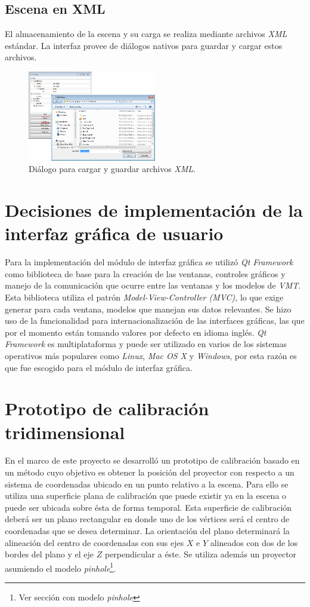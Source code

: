 \subsection{Escena en XML}
El almacenamiento de la escena y su carga se realiza mediante archivos \emph{XML} estándar. La interfaz provee de diálogos nativos para guardar y cargar estos archivos.

\begin{figure}[H]
  \centering
    \includegraphics[width=0.5\textwidth]{./Cap5_vmt/vmt_loadShow.png}
  \caption{Diálogo para cargar y guardar archivos \emph{XML}.}
  \label{fig:VMT-XML}
\end{figure}

\section{Decisiones de implementación de la interfaz gráfica de usuario}
Para la implementación del módulo de interfaz gráfica se utilizó \emph{Qt Framework} \cite{Qt-framework} como biblioteca de base para la creación de las ventanas, controles gráficos y manejo de la comunicación que ocurre entre las ventanas y los modelos de \emph{VMT}. Esta biblioteca utiliza el patrón \emph{Model-View-Controller (MVC)}, lo que exige generar para cada ventana, modelos que manejan sus datos relevantes.
Se hizo uso de la funcionalidad para internacionalización de las interfaces gráficas, las que por el momento están tomando valores por defecto en idioma inglés. \emph{Qt Framework} es multiplataforma y puede ser utilizado en varios de los sistemas operativos más populares como \emph{Linux}, \emph{Mac OS X} y \emph{Windows}, por esta razón es que fue escogido para el módulo de interfaz gráfica.

\section{Prototipo de calibración tridimensional}
En el marco de este proyecto se desarrolló un prototipo de calibración basado en un método cuyo objetivo es obtener la posición del proyector con respecto a un sistema de coordenadas ubicado en un punto relativo a la escena. Para ello se utiliza una superficie plana de calibración que puede existir ya en la escena o puede ser ubicada sobre ésta de forma temporal. Esta superficie de calibración deberá ser un plano rectangular en donde uno de los vértices será el centro de coordenadas que se desea determinar. La orientación del plano determinará la alineación del centro de coordenadas con sus ejes $X$ e $Y$ alineados con dos de los bordes del plano y el eje $Z$ perpendicular a éste. Se utiliza además un proyector asumiendo el modelo \emph{pinhole}\footnote{Ver sección con modelo \emph{pinhole}}.

